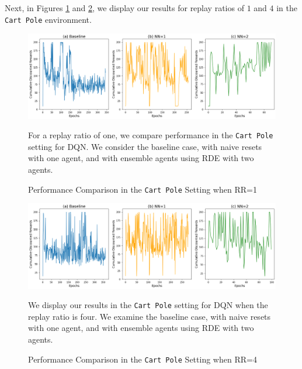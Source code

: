 \documentclass[base]{subfiles}
\begin{document}
\clearpage

Next, in Figures \ref{fig:cp_rr1} and \ref{fig:cp_rr4}, we display our results for replay ratios of $1$ and $4$ in the \texttt{Cart Pole} environment.

\begin{figure}[h!]
	\centering
	\caption{Performance Comparison in the \texttt{Cart Pole} Setting when RR=1}
	\label{fig:cp_rr1}
	\includegraphics[width = 1 \linewidth]{cp_RR1.png}
	\begin{flushleft} For a replay ratio of one, we compare performance in the \texttt{Cart Pole} setting for DQN. We consider the baseline case, with naive resets with one agent, and with ensemble agents using RDE with two agents. \end{flushleft}
\end{figure}

\begin{figure}[h!]
	\centering
	\caption{Performance Comparison in the \texttt{Cart Pole} Setting when RR=4}
	\label{fig:cp_rr4}
	\includegraphics[width = 1 \linewidth]{cp_RR4.png}
	\begin{flushleft} We display our results in the \texttt{Cart Pole} setting for DQN when the replay ratio is four. We examine the baseline case, with naive resets with one agent, and with ensemble agents using RDE with two agents. \end{flushleft}
\end{figure}
\end{document}
